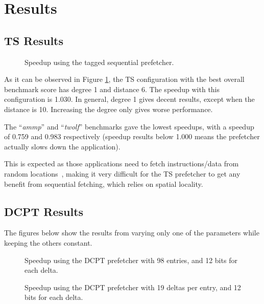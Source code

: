 \section{Results}
\label{sec:res}

\subsection{TS Results}

\begin{figure}[h]
    \begin{centering}
        
        \caption{Speedup using the tagged sequential prefetcher.}
        \label{figure:ts}
    \end{centering}
\end{figure}

As it can be observed in Figure \ref{figure:ts}, the TS configuration with the best
overall benchmark score has degree 1 and distance 6. The speedup with this configuration is 1.030.
In general, degree 1 gives decent results, except when the distance is 10. Increasing the degree only gives worse performance.

The ``\emph{ammp}'' and ``\emph{twolf}'' benchmarks
gave the lowest speedups, with a speedup of 0.759 and 0.983 respectively (speedup
results below 1.000 means the prefetcher actually slows down the application).

This is expected as those applications need to fetch instructions/data from
random locations~\cite[Sec.~4.2]{spec2000-memory}, making it very difficult for the TS prefetcher
to get any benefit from sequential fetching, which relies on spatial locality.

\subsection{DCPT Results}

The figures below show the results from varying only one of the parameters while keeping the others constant.
\begin{figure}[h]
    \begin{centering}
        
        \caption{Speedup using the DCPT prefetcher with 98 entries, and 12 bits for each delta.}
        \label{figure:dcpt-num-deltas}
    \end{centering}
\end{figure}

\begin{figure}[h]
    \begin{centering}
        
        \caption{Speedup using the DCPT prefetcher with 19 deltas per entry, and 12 bits for each delta.}
        \label{figure:dcpt-table-size}
    \end{centering}
\end{figure}

